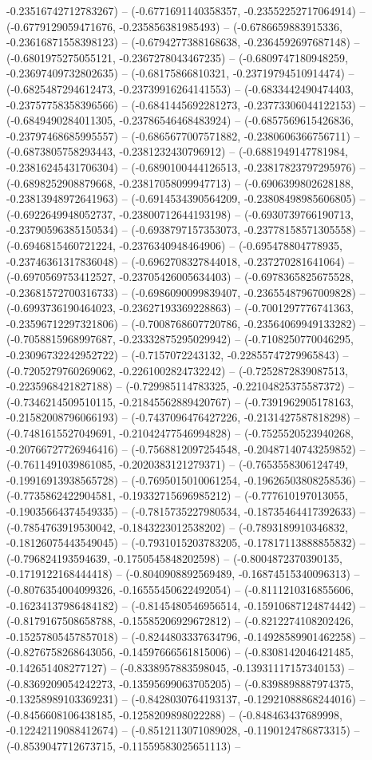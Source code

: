 -0.23516742712783267) -- (-0.6771691140358357, -0.23552252717064914) -- (-0.6779129059471676, -0.235856381985493) -- (-0.6786659883915336, -0.23616871558398123) -- (-0.6794277388168638, -0.2364592697687148) -- (-0.6801975275055121, -0.2367278043467235) -- (-0.6809747180948259, -0.23697409732802635) -- (-0.68175866810321, -0.23719794510914474) -- (-0.6825487294612473, -0.23739916264141553) -- (-0.6833442490474403, -0.23757758358396566) -- (-0.6841445692281273, -0.23773306044122153) -- (-0.6849490284011305, -0.23786546468483924) -- (-0.6857569615426836, -0.23797468685995557) -- (-0.6865677007571882, -0.2380606366756711) -- (-0.6873805758293443, -0.2381232430796912) -- (-0.6881949147781984, -0.23816245431706304) -- (-0.6890100444126513, -0.23817823797295976) -- (-0.6898252908879668, -0.23817058099947713) -- (-0.6906399802628188, -0.23813948972641963) -- (-0.6914534390564209, -0.23808498985606805) -- (-0.6922649948052737, -0.23800712644193198) -- (-0.6930739766190713, -0.23790596385150534) -- (-0.6938797157353073, -0.23778158571305558) -- (-0.6946815460721224, -0.2376340948464906) -- (-0.695478804778935, -0.23746361317836048) -- (-0.6962708327844018, -0.237270281641064) -- (-0.6970569753412527, -0.23705426005634403) -- (-0.6978365825675528, -0.23681572700316733) -- (-0.6986090099839407, -0.23655487967009828) -- (-0.6993736190464023, -0.23627193369228863) -- (-0.7001297776741363, -0.23596712297321806) -- (-0.7008768607720786, -0.23564069949133282) -- (-0.7058815968997687, -0.23332875295029942) -- (-0.7108250770046295, -0.23096732242952722) -- (-0.7157072243132, -0.22855747279965843) -- (-0.7205279760269062, -0.2261002824732242) -- (-0.7252872839087513, -0.2235968421827188) -- (-0.729985114783325, -0.22104825375587372) -- (-0.7346214509510115, -0.21845562889420767) -- (-0.7391962905178163, -0.21582008796066193) -- (-0.7437096476427226, -0.2131427587818298) -- (-0.7481615527049691, -0.21042477546994828) -- (-0.7525520523940268, -0.20766727726946416) -- (-0.7568812097254548, -0.20487140743259852) -- (-0.7611491039861085, -0.2020383121279371) -- (-0.7653558306124749, -0.19916913938565728) -- (-0.7695015010061254, -0.19626503808258536) -- (-0.7735862422904581, -0.19332715696985212) -- (-0.777610197013055, -0.19035664374549335) -- (-0.7815735227980534, -0.18735464417392633) -- (-0.7854763919530042, -0.1843223012538202) -- (-0.7893189910346832, -0.18126075443549045) -- (-0.7931015203783205, -0.17817113888855832) -- (-0.796824193594639, -0.1750545848202598) -- (-0.8004872370390135, -0.1719122168444418) -- (-0.8040908892569489, -0.16874515340096313) -- (-0.8076354004099326, -0.16555450622492054) -- (-0.8111210316855606, -0.16234137986484182) -- (-0.8145480546956514, -0.15910687124874442) -- (-0.8179167508658788, -0.15585206929672812) -- (-0.8212274108202426, -0.15257805457857018) -- (-0.8244803337634796, -0.14928589901462258) -- (-0.8276758268643056, -0.14597666561815006) -- (-0.8308142046421485, -0.142651408277127) -- (-0.8338957883598045, -0.13931117157340153) -- (-0.8369209054242273, -0.13595699063705205) -- (-0.8398898887974375, -0.13258989103369231) -- (-0.8428030764193137, -0.12921088868244016) -- (-0.8456608106438185, -0.1258209898022288) -- (-0.848463437689998, -0.12242119088412674) -- (-0.8512113071089028, -0.1190124786873315) -- (-0.8539047712673715, -0.11559583025651113) -- 